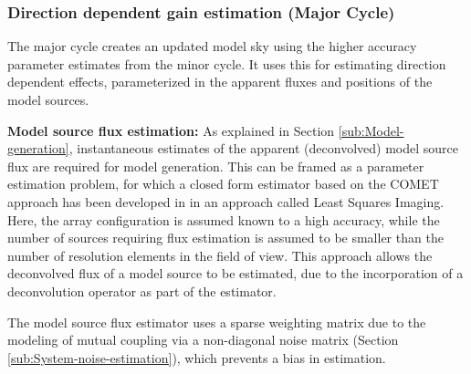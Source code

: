 \documentclass{aa}
\begin{document}
\subsubsection{\label{sub:Direction-dependent-gain}Direction dependent gain estimation (Major Cycle)}  

The major cycle  creates an updated  model sky using  the higher
accuracy parameter estimates  from the minor cycle. It  uses this for estimating
direction dependent effects, parameterized  in the apparent fluxes and positions
of the model sources.

\textbf{Model    source   flux    estimation:}   As    explained    in   Section
\ref{sub:Model-generation},    instantaneous   estimates    of    the   apparent
(deconvolved) model source flux are  required for model generation.  This can be
framed  as a parameter  estimation problem,  for which  a closed  form estimator
based     on     the     COMET     approach    has     been     developed     in
\citep{wijnholds2008fundamental}  in an approach  called Least  Squares Imaging.
Here, the  array configuration is  assumed known to  a high accuracy,  while the
number of  sources requiring flux estimation  is assumed to be  smaller than the
number of  resolution elements in the  field of view.  This  approach allows the
deconvolved flux of a model source  to be estimated, due to the incorporation of
a    deconvolution    operator   as    part    of    the   estimator.


  The model  source flux estimator uses a  sparse weighting matrix
due to the modeling of mutual  coupling via a non-diagonal noise matrix (Section
\ref{sub:System-noise-estimation}), which prevents a bias in estimation.
\end{document}
